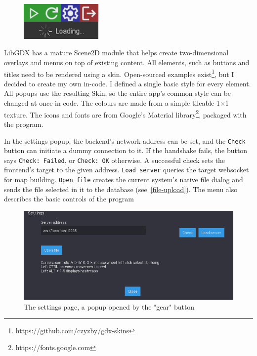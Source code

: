 \begin{figure}[!h]
    \centering
    \includegraphics[width=40mm, keepaspectratio]{images/menu-buttons.png}
    \caption{}
\end{figure}

LibGDX has a mature Scene2D module that helps create two-dimensional overlays and menus on top of existing content. All elements, such as buttons and titles need to be rendered using a skin. Open-sourced examples exist\footnote{https://github.com/czyzby/gdx-skins}, but I decided to create my own in-code. I defined a single basic style for every element. All popups use the resulting Skin, so the entire app's common style can be changed at once in code. The colours are made from a simple tileable 1$\times$1 texture. The icons and fonts are from Google's Material library\footnote{https://fonts.google.com}, packaged with the program.

In the settings popup, the backend's network address can be set, and the \verb|Check| button can initiate a dummy connection to it. If the handshake fails, the button says \verb|Check: Failed|, or \verb|Check: OK| otherwise. A successful check sets the frontend's target to the given address. \verb|Load server| queries the target websocket for map building. \verb|Open file| creates the current system's native file dialog and sends the file selected in it to the database (see~\ref{file-upload}). The menu also describes the basic controls of the program

\begin{figure}[!ht]
    \centering
    \includegraphics[width=150mm, keepaspectratio]{images/settings.png}
    \caption{The settings page, a popup opened by the "gear" button}
\end{figure}

